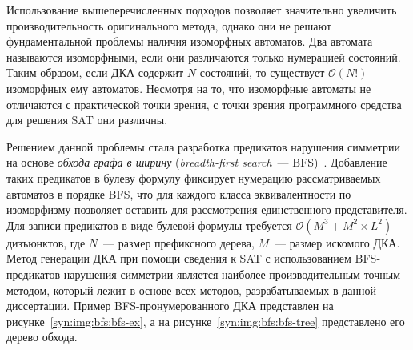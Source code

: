 Использование вышеперечисленных подходов позволяет значительно увеличить производительность оригинального метода, однако они не решают фундаментальной проблемы наличия изоморфных автоматов.
Два автомата называются изоморфными, если они различаются только нумерацией состояний.
Таким образом, если ДКА содержит $N$ состояний, то существует $\mathcal{O}\left(N!\right)$ изоморфных ему автоматов.
Несмотря на то, что изоморфные автоматы не отличаются с практической точки зрения, с точки зрения программного средства для решения SAT они различны.

Решением данной проблемы стала разработка предикатов нарушения симметрии на основе \emph{обхода графа в ширину} (\emph{breadth-first search}~--- BFS)~\cite{zakirzyanov2015LATA}.
Добавление таких предикатов в булеву формулу фиксирует нумерацию рассматриваемых автоматов в порядке BFS, что для каждого класса эквивалентности по изоморфизму позволяет оставить для рассмотрения единственного представителя.
Для записи предикатов в виде булевой формулы требуется $\mathcal{O}\left(M^{3} + M^{2} \times L^{2}\right)$ дизъюнктов, где $N$~--- размер префиксного дерева, $M$~--- размер искомого ДКА.
Метод генерации ДКА при помощи сведения к SAT с использованием BFS-предикатов нарушения симметрии является наиболее производительным точным методом, который лежит в основе всех методов, разрабатываемых в данной диссертации.
Пример BFS-пронумерованного ДКА представлен на рисунке~\ref{syn:img:bfs:bfs-ex}, а на рисунке~\ref{syn:img:bfs:bfs-tree} представлено его дерево обхода.

